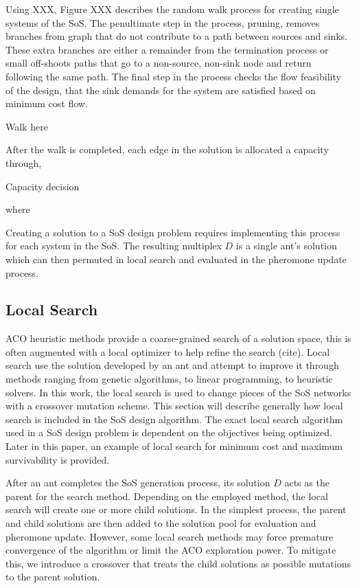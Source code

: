 \documentclass[preprint,12pt]{elsarticle}
\begin{document}
Using XXX, Figure XXX describes the random walk process for creating single systems of the SoS. The penultimate step in the process, pruning, removes branches from graph that do not contribute to a path between sources and sinks. These extra branches are either a remainder from the termination process or small off-shoots paths that go to a non-source, non-sink node and return following the same path. The final step in the process checks the flow feasibility of the design, that the sink demands for the system are satisfied based on minimum cost flow.

Walk here


After the walk is completed, each edge in the solution is allocated a capacity through,

Capacity decision

where 

Creating a solution to a SoS design problem requires implementing this process for each system in the SoS. The resulting multiplex $D$ is a single ant's solution which can then permuted in local search and evaluated in the pheromone update process.


\subsection{Local Search} \label{sec:search}

ACO heuristic methods provide a coarse-grained search of a solution space, this is often augmented with a local optimizer to help refine the search (cite). Local search use the solution developed by an ant and attempt to improve it through methods ranging from genetic algorithms, to linear programming, to heuristic solvers. In this work, the local search is used to change pieces of the SoS networks with a crossover mutation scheme. This section will describe generally how local search is included in the SoS design algorithm. The exact local search algorithm used in a SoS design problem is dependent on the objectives being optimized. Later in this paper, an example of local search for minimum cost and maximum survivability is provided. 

After an ant completes the SoS generation process, its solution $D$ acts as the parent for the search method. Depending on the employed method, the local search will create one or more child solutions. In the simplest process, the parent and child solutions are then added to the solution pool for evaluation and pheromone update. However, some local search methods may force premature convergence of the algorithm or limit the ACO exploration power. To mitigate this, we introduce a crossover that treats the child solutions as possible mutations to the parent solution.
\end{document}
